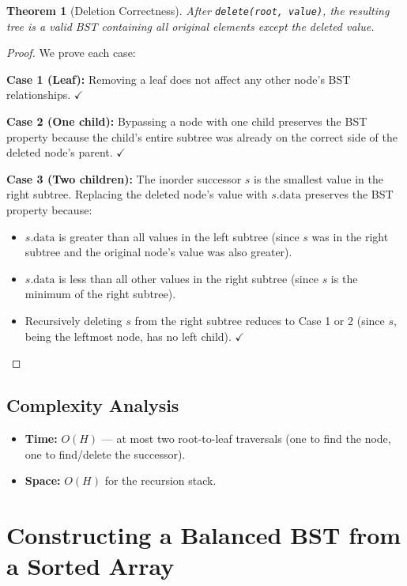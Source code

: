 \documentclass[10pt,journal,compsoc,onecolumn]{IEEEtran}
\newtheorem{theorem}{Theorem}
\begin{document}
\begin{theorem}[Deletion Correctness]
After \texttt{delete(root, value)}, the resulting tree is a valid BST containing all original elements except the deleted value.
\end{theorem}

\begin{proof}
We prove each case:

\textbf{Case 1 (Leaf):} Removing a leaf does not affect any other node's BST relationships. $\checkmark$

\textbf{Case 2 (One child):} Bypassing a node with one child preserves the BST property because the child's entire subtree was already on the correct side of the deleted node's parent. $\checkmark$

\textbf{Case 3 (Two children):} The inorder successor $s$ is the smallest value in the right subtree. Replacing the deleted node's value with $s.\text{data}$ preserves the BST property because:
\begin{itemize}
    \item $s.\text{data}$ is greater than all values in the left subtree (since $s$ was in the right subtree and the original node's value was also greater).
    \item $s.\text{data}$ is less than all other values in the right subtree (since $s$ is the minimum of the right subtree).
    \item Recursively deleting $s$ from the right subtree reduces to Case 1 or 2 (since $s$, being the leftmost node, has no left child). $\checkmark$
\end{itemize}
\end{proof}

\subsection{Complexity Analysis}

\begin{itemize}
    \item \textbf{Time:} $O(H)$ --- at most two root-to-leaf traversals (one to find the node, one to find/delete the successor).
    \item \textbf{Space:} $O(H)$ for the recursion stack.
\end{itemize}

\section{Constructing a Balanced BST from a Sorted Array}
\label{sec:construct}
\end{document}
